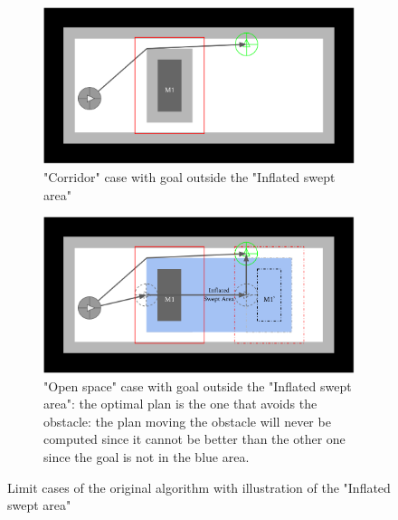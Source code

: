 \begin{figure}[H]
\begin{subfigure}{.48\textwidth}
  \centering
  \includegraphics[width=\linewidth]{Figures/Check_New_Opening/openspace_original_offseted.png}
  \caption{"Corridor" case with goal outside the "Inflated swept area"}
  \label{fig:corridor_swept_offseted}
\end{subfigure}\hspace*{\fill}
\begin{subfigure}{.48\textwidth}
  \centering
  \includegraphics[width=\linewidth]{Figures/Check_New_Opening/openspace_swept_offseted.png}
  \caption{"Open space" case with goal outside the "Inflated swept area": the optimal plan is the one that avoids the obstacle: the plan moving the obstacle will never be computed since it cannot be better than the other one since the goal is not in the blue area.}
  \label{fig:openspace_swept_offseted}
\end{subfigure}

\caption{Limit cases of the original algorithm with illustration of the "Inflated swept area"} %
\label{fig:inflated_swept_area}
\end{figure}

